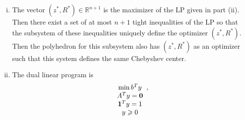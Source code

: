\documentclass[11pt]{article}
\newcommand{\setR}{\mathbb{R}}
\renewcommand{\leq}{\leqslant}
\renewcommand{\geq}{\geqslant}
\begin{document}
\begin{enumerate}[1)]
\begin{solution}
\begin{enumerate}[i)]
This. is equivalent to 
\begin{align*}
\max_{z^\ast, R^\ast}  R^\ast &\\
\text{s.t. } & A(z^\ast + x) \leq b \quad \quad \text{ for every } x \in \setR^n \text{ s.t. } \Vert x\Vert \leq R^\ast.
\end{align*}

Note that for any row $i$, $a_i^T(z^\ast + x) \leq a_i^T(z^\ast + a_i / \Vert a_i \Vert R^\ast)$ since $\Vert x \Vert \leq R^\ast$ and $a_i^T x \leq \Vert x\Vert \frac{a_i^Ta_i}{\Vert a_i \Vert}$ (this is just the projection from part (i)). Then, the Chebyshev center is defined by 
\begin{align*}
\max_{z^\ast, R^\ast} & R^\ast \\
\text{s.t. } &  a_i^T(z^\ast + a_i / \Vert a_i \Vert R^\ast) \leq b_i \quad i \in [m]
\end{align*} 


since if the above constraints hold, then the constraints over all $x$ with $\Vert x\Vert \leq R^\ast$ also hold. Then this LP is equivalent to 
\begin{align*}
\max_{z^\ast, R^\ast} & R^\ast \\
\text{s.t. } & A^Tz^\ast + 1 R^\ast \leq b
\end{align*}

since $\Vert a_i \Vert = 1$ for every $i$. 

\item The vector $(z^\ast, R^\ast) \in \setR^{n+1}$ is the maximizer of the LP given in part (ii). Then there exist a set of at most $n+1$ tight inequalities of the LP so that the subsystem of these inequalities uniquely define the optimizer $(z^\ast, R^\ast)$. Then the polyhedron for this subsystem also has $(z^\ast, R^\ast)$ as an optimizer such that this system defines the same Chebyshev center. 

\item The dual linear program is 
\begin{displaymath}
  \begin{array}[t]{c}
    \min b^Ty \\
        A^T y = \mathbf{0}\\
        \mathbf{1}^T y = 1\\
        y\geq 0
  \end{array},
\end{displaymath}

  \end{enumerate}
  \end{solution}



\end{enumerate}
\end{document}
